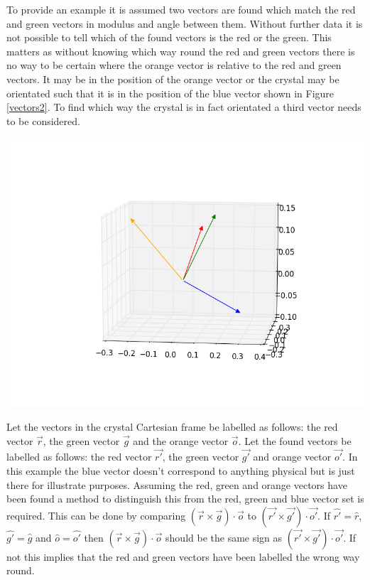 \documentclass[10pt,a4paper]{article}
\begin{document}
\begin{multicols}{2}
To provide an example it is assumed two vectors are found which match the red and green vectors in modulus and angle between them. Without further data it is not possible to tell which of the found vectors is the red or the green. This matters as without knowing which way round the red and green vectors there is no way to be certain where the orange vector is relative to the red and green vectors. It may be in the position of the orange vector or the crystal may be orientated such that it is in the position of the blue vector shown in Figure \ref{vectors2}. To find which way the crystal is in fact orientated a third vector needs to be considered.
\begin{center}
\includegraphics [width=\columnwidth]{four_vectors.png}
\label{vectors2}
\end{center}
Let the vectors in the crystal Cartesian frame be labelled as follows: the red vector $\vec{r}$, the green vector $\vec{g}$ and the orange vector $\vec{o}$. Let the found vectors be labelled as follows: the red vector $\vec{r'}$, the green vector $\vec{g'}$ and orange vector $\vec{o'}$. In this example the blue vector doesn't correspond to anything physical but is just there for illustrate purposes. Assuming the red, green and orange vectors have been found a method to distinguish this from the red, green and blue vector set is required. This can be done by comparing $(\vec{r} \times \vec{g})\cdot \vec{o}$ to  $(\vec{r'} \times \vec{g'})\cdot \vec{o'}$. If $\hat{r'}=\hat{r}$, $\hat{g'}=\hat{g}$ and $\hat{o}=\hat{o'}$ then  $(\vec{r} \times \vec{g})\cdot \vec{o}$ should be the same sign as $(\vec{r'} \times \vec{g'})\cdot \vec{o'}$. If not this implies that the red and green vectors have been labelled the wrong way round.


\end{multicols}
\end{document}
